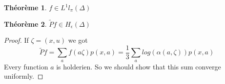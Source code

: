 \documentclass[12pt]{article}
\theoremstyle{plain}%
\newtheorem{thm}{Théorème}[section]
\theoremstyle{definition}
\theoremstyle{remark}
\begin{document}
\begin{thm}
$f \in L^1l_\pi(\Delta)$
\end{thm}

\begin{thm}
$\tilde{P}f \in H_\epsilon(\Delta)$
\end{thm}

\begin{proof}
If $\zeta=(x,u)$ we got \[
\tilde{P}f=\sum_a f(a \zeta) p(x,a) = \frac{1}{3} \sum_a log(\alpha(a,\zeta))p(x,a)
\]
Every function $a$ is holderien. So we should show that this sum converge uniformly.
\end{proof}



\end{document}

